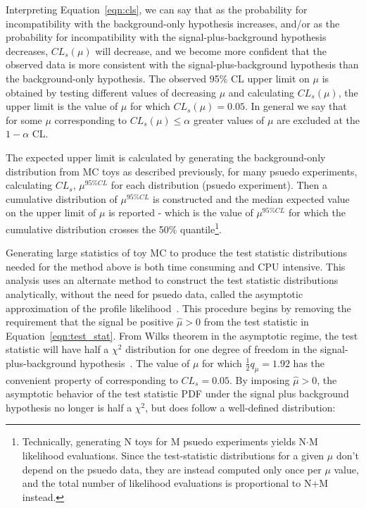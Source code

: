 \noindent Interpreting Equation~\ref{eqn:cls}, we can say that as the probability for incompatibility with the background-only hypothesis increases, and/or as the probability
for incompatibility with the signal-plus-background hypothesis decreases, $CL_{s}(\mu)$ will decrease, and we become more confident that the observed data is more consistent with
the signal-plus-background hypothesis than the background-only hypothesis. The observed 95$\%$ CL upper limit on $\mu$ is obtained by testing different values of decreasing $\mu$ and
calculating $CL_{s}(\mu)$, the upper limit is the value of $\mu$ for which $CL_{s}(\mu) = 0.05$. In general we say that for some $\mu$ corresponding to $CL_{s}(\mu) \leq \alpha$
greater values of $\mu$ are excluded at the $1-\alpha$ CL. 

The expected upper limit is calculated by generating the background-only distribution from MC toys as described previously, for many psuedo experiments, calculating $CL_{s}$, $\mu^{95\% CL}$
for each distribution (psuedo experiment). Then a cumulative distribution of $\mu^{95\% CL}$ is constructed and the median expected value on the upper limit of $\mu$ is reported - which is the value
of $\mu^{95\% CL}$ for which the cumulative distribution crosses the 50$\%$ quantile\footnote{Technically, generating N toys for M psuedo experiments yields N$\cdot$M likelihood evaluations. Since the test-statistic
distributions for a given $\mu$ don't depend on the psuedo data, they are instead computed only once per $\mu$ value, and the total number of likelihood evaluations is proportional to N+M instead.}.

Generating large statistics of toy MC to produce the test statistic distributions needed for the method above is both time consuming and CPU intensive. This analysis uses an alternate method to
construct the test statistic distributions analytically, without the need for psuedo data, called the asymptotic approximation of the profile likelihood~\cite{AsymptoticLimits}.  
This procedure begins by removing the requirement that the signal be positive $\hat{\mu} > 0$ from the test statistic in Equation~\ref{eqn:test_stat}. From Wilks theorem
in the asymptotic regime, the test statistic will have half a $\chi^{2}$ distribution for one degree of freedom in the signal-plus-background hypothesis~\cite{wilks}. The value of $\mu$ for which
$\frac{1}{2}q_{\mu} = 1.92$ has the convenient property of corresponding to $CL_{s} = 0.05$. By imposing $\hat{\mu} > 0$, the asymptotic behavior of the test statistic PDF under the signal plus
background hypothesis no longer is half a $\chi^{2}$, but does follow a well-defined distribution:


